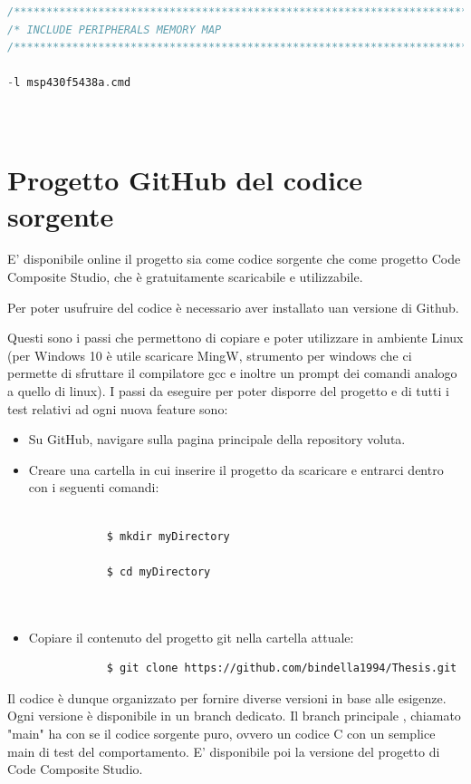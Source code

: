 \documentclass[LaM,binding=0.6cm]{../sapthesis}
\begin{document}
\begin{lstlisting}[language=C]
/****************************************************************************/
/* INCLUDE PERIPHERALS MEMORY MAP                                           */
/****************************************************************************/

-l msp430f5438a.cmd

    
\end{lstlisting}

\chapter{Progetto GitHub del codice sorgente}
E' disponibile online il progetto sia come codice sorgente che come progetto Code Composite Studio, che è gratuitamente
scaricabile e utilizzabile.

Per poter usufruire del codice è necessario aver installato uan versione di Github.

Questi sono i passi che permettono di copiare e poter utilizzare in ambiente Linux (per Windows 10 è utile scaricare MingW, strumento per windows che ci permette di sfruttare il compilatore gcc e inoltre un prompt dei comandi analogo a quello di linux).
I passi da eseguire per poter disporre del progetto e di tutti i test relativi ad ogni nuova feature sono:

\begin{itemize}
     \item Su GitHub, navigare sulla pagina principale della repository voluta.
    
    \item Creare una cartella in cui inserire il progetto da scaricare e entrarci dentro con i seguenti comandi:
    \begin{verbatim}

            $ mkdir myDirectory
            
            $ cd myDirectory
      
     
    \end{verbatim}
    \item Copiare il contenuto del progetto git nella cartella attuale:
        \begin{verbatim}
            $ git clone https://github.com/bindella1994/Thesis.git
        \end{verbatim}
\end{itemize}

Il codice è dunque organizzato per fornire diverse versioni in base alle esigenze.
Ogni versione è disponibile in un branch dedicato. Il branch principale , chiamato "main" ha con se il codice sorgente puro, ovvero un codice C con un semplice main di test del comportamento.
E' disponibile poi la versione del progetto di Code Composite Studio.
\end{document}
